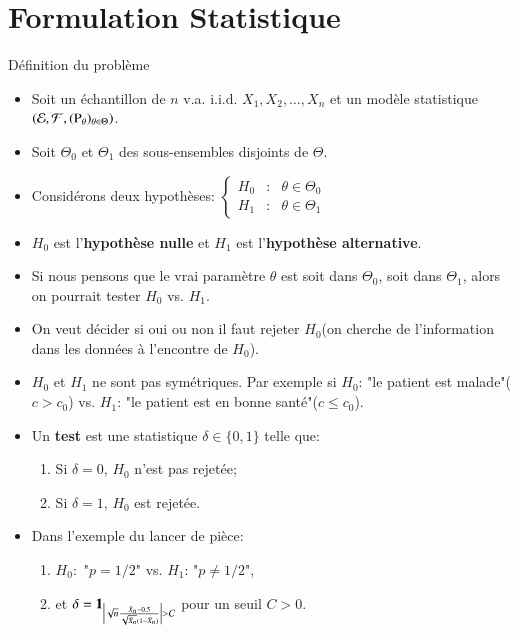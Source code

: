 \section{Formulation Statistique}
\frame{\sectionpage}
\begin{frame}
    [allowframebreaks]{Définition du problème}
    \begin{itemize}
        \item Soit un échantillon de $n$ v.a. i.i.d. $X_1, X_2, \ldots, X_n$ et un modèle statistique 
        $\left(\mathcal{E}, \mathcal{F}, (\operatorname{P}_\theta)_{\theta\in \Theta}\right)$.
        \item Soit $\Theta_0$ et $\Theta_1$ des sous-ensembles disjoints de $\Theta$.
        \item Considérons deux hypothèses: $\left\{  \begin{array}{lll}
            H_0 &:&\theta\in \Theta_0\\
            H_1 &:&\theta\in \Theta_1
        \end{array}\right.$
        \item $H_0$ est l'\textbf{hypothèse nulle} et $H_1$ est l'\textbf{hypothèse alternative}.
        \item Si nous pensons que le vrai paramètre $\theta$ est soit dans $\Theta_0$, soit dans $\Theta_1$, alors on pourrait tester $H_0$ vs. $H_1$.
        \item On veut décider si oui ou non il faut rejeter $H_0$(on cherche de l'information dans les données à l'encontre de $H_0$).
    \framebreak
         \item $H_0$ et $H_1$ ne sont pas symétriques. Par exemple si $H_0$: "le patient est malade"($c>c_0$) vs. $H_1$: "le 
         patient est en bonne santé"($c\leq c_0$).
         \item Un \textbf{test} est une statistique $\delta\in\{0, 1\}$ telle que: 
         \begin{enumerate}[-]
             \item  Si $\delta = 0$, $H_0$ n'est pas rejetée;
             \item Si $\delta = 1$, $H_0$ est rejetée.
         \end{enumerate}
         \item Dans l'exemple du lancer de pièce: 
         \begin{enumerate}[-]
               \item $H_0:$ "$p=1/2$" vs. $H_1$: "$p\neq 1/2$",
               \item et $\delta = \mathbf{1}_{\left\vert { \sqrt{n}\frac{\bar{X}_n - 0.5}{\sqrt{\bar{X}_n}(1-\bar{X}_n)}} \right\vert > C}$ pour un seuil $C >0$.

\end{enumerate}
\end{itemize}
\end{frame}
